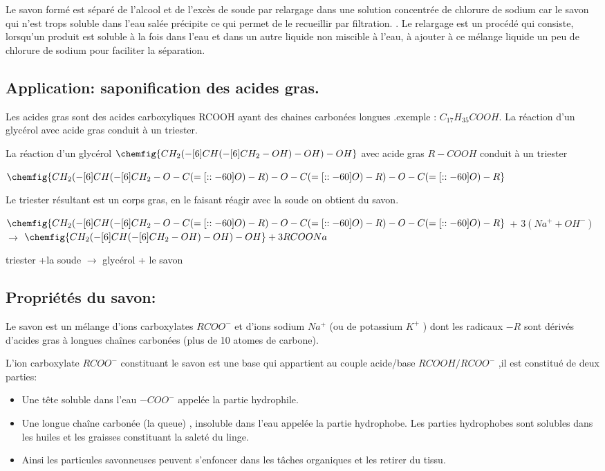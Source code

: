 \documentclass[12pt]{article}
\begin{document}
Le savon formé est séparé de l'alcool et de l’excès de soude par relargage dans une solution concentrée de chlorure de sodium
car le savon qui n'est trops soluble dans l’eau salée précipite ce qui permet de le recueillir par filtration.
. Le relargage est un procédé qui consiste, lorsqu'un produit est soluble à la fois dans l'eau et dans un autre liquide non
miscible à l'eau, à ajouter à ce mélange liquide un peu de chlorure de sodium pour faciliter la séparation.

\subsection{Application: saponification des acides gras.}
Les acides gras sont des acides carboxyliques RCOOH ayant des chaines carbonées longues .exemple : $C_{17}H_{35}COOH$.
La réaction d'un glycérol avec acide gras conduit à un triester.

La réaction d'un glycérol $\chemfig{CH_2(-[6]CH(-[6]CH_2-OH)-OH)-OH}$
 avec acide gras $R-COOH$ conduit à un  triester 

 $\chemfig{CH_2(-[6]CH(-[6]CH_2-O-C(=[::-60]O)-R)-O-C(=[::-60]O)-R)-O-C(=[::-60]O)-R}$

Le triester résultant est un corps gras, en le faisant réagir avec la soude on obtient du savon. 


 $\chemfig{CH_2(-[6]CH(-[6]CH_2-O-C(=[::-60]O)-R)-O-C(=[::-60]O)-R)-O-C(=[::-60]O)-R}$ + $3(Na^+ + OH^-)$ $\rightarrow$ $\chemfig{CH_2(-[6]CH(-[6]CH_2-OH)-OH)-OH} + 3RCOONa$


 triester +la soude $\rightarrow$ glycérol + le savon


 \subsection{Propriétés du savon:}
 Le savon est un mélange d'ions carboxylates $RCOO^-$ et d'ions sodium $Na^+$ (ou de potassium $K^+$ ) dont les radicaux $-R$ sont
dérivés d’acides gras à longues chaînes carbonées (plus de 10 atomes de carbone).

L'ion carboxylate $RCOO^-$ constituant le savon est une base qui appartient au couple acide/base $RCOOH/RCOO^-$ ,il
est constitué de deux parties:

\begin{itemize}

	\item Une tête soluble dans l’eau $-COO^-$ appelée la partie hydrophile.
	\item Une longue chaîne carbonée (la queue) , insoluble dans l'eau appelée la partie hydrophobe. Les parties hydrophobes
sont solubles dans les huiles et les graisses constituant la saleté du linge.
\item Ainsi les particules savonneuses peuvent s’enfoncer dans les tâches organiques et les retirer du tissu.
\end{itemize}
\end{document}

